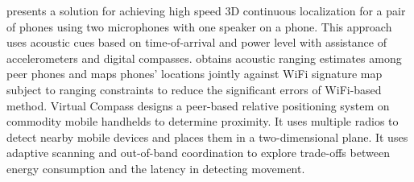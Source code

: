 \cite{qiu2011feasibility} presents a solution for achieving high speed 3D continuous
localization for a pair of phones using two microphones with one
speaker on a phone. This approach uses acoustic cues based on time-of-arrival and
power level with assistance of accelerometers and digital compasses.
\cite{liu2012push} obtains acoustic ranging estimates
among peer phones and maps phones' locations jointly against
 WiFi signature map subject to ranging constraints
 to reduce the significant errors of WiFi-based method.
Virtual Compass \cite{banerjee2010virtual} designs a
 peer-based relative positioning system on commodity mobile handhelds
 to determine proximity.
It uses multiple radios to detect nearby
 mobile devices and places them in a two-dimensional plane.
It uses adaptive scanning and out-of-band coordination to explore trade-offs between
energy consumption and the latency in detecting movement.

%

